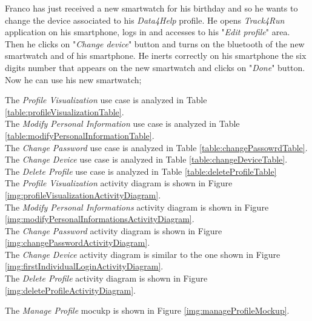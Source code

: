 Franco has just received a new smartwatch for his birthday and so he wants to change the device associated to his \textit{Data4Help} profile. He opens \textit{Track4Run} application on his smartphone, logs in and accesses to his "\textit{Edit profile}" area. Then he clicks on "\textit{Change device}" button and turns on the bluetooth of the new smartwatch and of his smartphone. He inerts correctly on his smartphone the six digits number that appears on the new smartwatch and clicks on "\textit{Done}" button. Now he can use his new smartwatch;

The \textit{Profile Visualization} use case is analyzed in Table \ref{table:profileVisualizationTable}. \\
The \textit{Modify Personal Information} use case is analyzed in Table \ref{table:modifyPersonalInformationTable}. \\
The \textit{Change Password} use case is analyzed in Table \ref{table:changePassowrdTable}. \\
The \textit{Change Device} use case is analyzed in Table \ref{table:changeDeviceTable}. \\
The \textit{Delete Profile} use case is analyzed in Table \ref{table:deleteProfileTable} \\

The \textit{Profile Visualization} activity diagram is shown in Figure \ref{img:profileVisualizationActivityDiagram}. \\
The \textit{Modify Personal Informations} activity diagram is shown in Figure \ref{img:modifyPersonalInformationsActivityDiagram}. \\
The \textit{Change Password} activity diagram is shown in Figure \ref{img:changePasswordActivityDiagram}. \\
The \textit{Change Device} activity diagram is similar to the one shown in Figure \ref{img:firstIndividualLoginActivityDiagram}. \\
The \textit{Delete Profile} activity diagram is shown in Figure \ref{img:deleteProfileActivityDiagram}.

The \textit{Manage Profile} mocukp is shown in Figure \ref{img:manageProfileMockup}.

